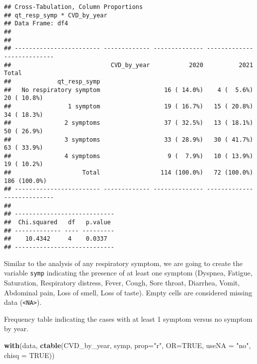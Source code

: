 \documentclass[
]{article}
\newenvironment{Shaded}{\begin{snugshade}}{\end{snugshade}}
\newcommand{\AttributeTok}[1]{\textcolor[rgb]{0.13,0.29,0.53}{#1}}
\newcommand{\ConstantTok}[1]{\textcolor[rgb]{0.56,0.35,0.01}{#1}}
\newcommand{\FunctionTok}[1]{\textcolor[rgb]{0.13,0.29,0.53}{\textbf{#1}}}
\newcommand{\NormalTok}[1]{#1}
\newcommand{\StringTok}[1]{\textcolor[rgb]{0.31,0.60,0.02}{#1}}
\begin{document}
\begin{verbatim}
## Cross-Tabulation, Column Proportions  
## qt_resp_symp * CVD_by_year  
## Data Frame: df4  
## 
## 
## ------------------------ ------------- -------------- ------------- --------------
##                            CVD_by_year           2020          2021          Total
##             qt_resp_symp                                                          
##   No respiratory symptom                  16 ( 14.0%)    4 (  5.6%)    20 ( 10.8%)
##                1 symptom                  19 ( 16.7%)   15 ( 20.8%)    34 ( 18.3%)
##               2 symptoms                  37 ( 32.5%)   13 ( 18.1%)    50 ( 26.9%)
##               3 symptoms                  33 ( 28.9%)   30 ( 41.7%)    63 ( 33.9%)
##               4 symptoms                   9 (  7.9%)   10 ( 13.9%)    19 ( 10.2%)
##                    Total                 114 (100.0%)   72 (100.0%)   186 (100.0%)
## ------------------------ ------------- -------------- ------------- --------------
## 
## ----------------------------
##  Chi.squared   df   p.value 
## ------------- ---- ---------
##    10.4342     4    0.0337  
## ----------------------------
\end{verbatim}

Similar to the analysis of any respiratory symptom, we are going to
create the variable \texttt{symp} indicating the presence of at least
one symptom (Dyspnea, Fatigue, Saturation, Respiratory distress, Fever,
Cough, Sore throat, Diarrhea, Vomit, Abdominal pain, Loss of smell, Loss
of taste). Empty cells are considered missing data
(\texttt{\textless{}NA\textgreater{}}).

Frequency table indicating the cases with at least 1 symptom versus no
symptom by year.

\begin{Shaded}
\begin{Highlighting}[]
\FunctionTok{with}\NormalTok{(data, }\FunctionTok{ctable}\NormalTok{(CVD\_by\_year, symp, }\AttributeTok{prop=}\StringTok{"r"}\NormalTok{, }\AttributeTok{OR=}\ConstantTok{TRUE}\NormalTok{, }\AttributeTok{useNA =} \StringTok{"no"}\NormalTok{, }\AttributeTok{chisq =} \ConstantTok{TRUE}\NormalTok{))}
\end{Highlighting}
\end{Shaded}
\end{document}
